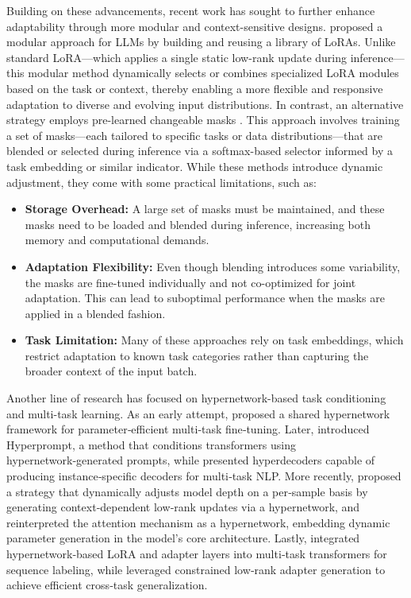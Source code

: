 Building on these advancements, recent work has sought to further enhance adaptability through more modular and context-sensitive designs. \cite{ostapenko2024modular} proposed a modular approach for LLMs by building and reusing a library of LoRAs. Unlike standard LoRA—which applies a single static low-rank update during inference—this modular method dynamically selects or combines specialized LoRA modules based on the task or context, thereby enabling a more flexible and responsive adaptation to diverse and evolving input distributions. In contrast, an alternative strategy employs pre-learned changeable masks \citep{sun2025text}. This approach involves training a set of masks—each tailored to specific tasks or data distributions—that are blended or selected during inference via a softmax-based selector informed by a task embedding or similar indicator. While these methods introduce dynamic adjustment, they come with some practical limitations, such as:
\begin{itemize}
    \item \textbf{Storage Overhead:} A large set of masks must be maintained, and these masks need to be loaded and blended during inference, increasing both memory and computational demands.
    \item \textbf{Adaptation Flexibility:} Even though blending introduces some variability, the masks are fine-tuned individually and not co-optimized for joint adaptation. This can lead to suboptimal performance when the masks are applied in a blended fashion.
    \item \textbf{Task Limitation:} Many of these approaches rely on task embeddings, which restrict adaptation to known task categories rather than capturing the broader context of the input batch.
\end{itemize}

Another line of research has focused on hypernetwork-based task conditioning and multi-task learning. As an early attempt, \citet{karimi2021parameter} proposed a shared hypernetwork framework for parameter‑efficient multi‑task fine‑tuning. Later, \citet{he2022hyperprompt} introduced Hyperprompt, a method that conditions transformers using hypernetwork‑generated prompts, while \citet{ivison2022hyperdecoders} presented hyperdecoders capable of producing instance‑specific decoders for multi‑task NLP. More recently, \citet{zheng2024dlo} proposed a strategy that dynamically adjusts model depth on a per‑sample basis by generating context‑dependent low‑rank updates via a hypernetwork, and \citet{schug2024attention} reinterpreted the attention mechanism as a hypernetwork, embedding dynamic parameter generation in the model’s core architecture. Lastly, \citet{ortiz2024hyperloader} integrated hypernetwork‑based LoRA and adapter layers into multi‑task transformers for sequence labeling, while \citet{lv2024hyperlora} leveraged constrained low‑rank adapter generation to achieve efficient cross‑task generalization.


